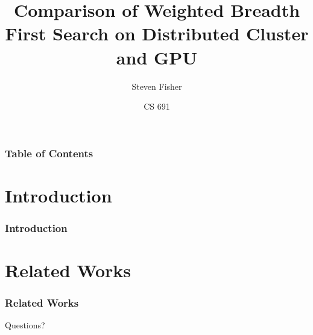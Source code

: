 \documentclass{beamer}
\title[CS 691]{Comparison of Weighted Breadth First Search on Distributed Cluster and GPU}
\author{Steven Fisher}
\institute[UNR]{University of Nevada, Reno}
\date
{CS 691}
\begin{document}
\frame{\titlepage}
\begin{frame}
    \frametitle{Table of Contents}
    \tableofcontents
\end{frame}

\section{Introduction}
\begin{frame}
  \frametitle{Introduction}  
\end{frame}
\section{Related Works}
\begin{frame}
  \frametitle{Related Works}
\end{frame}

\begin{frame}
  \begin{center}
    Questions?
  \end{center}
  \end{frame}
\end{document}

